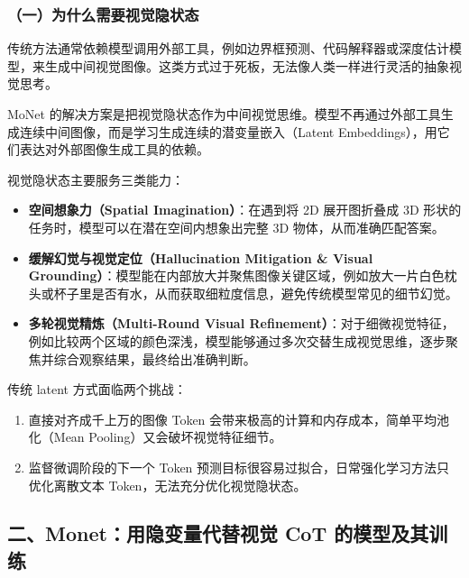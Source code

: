 \hypertarget{ux4e00ux4e3aux4ec0ux4e48ux9700ux8981ux89c6ux89c9ux9690ux72b6ux6001}{%
\subsubsection{（一）为什么需要视觉隐状态}\label{ux4e00ux4e3aux4ec0ux4e48ux9700ux8981ux89c6ux89c9ux9690ux72b6ux6001}}

传统方法通常依赖模型调用外部工具，例如边界框预测、代码解释器或深度估计模型，来生成中间视觉图像。这类方式过于死板，无法像人类一样进行灵活的抽象视觉思考。

MoNet 的解决方案是把视觉隐状态作为中间视觉思维。模型不再通过外部工具生成连续中间图像，而是学习生成连续的潜变量嵌入（Latent Embeddings），用它们表达对外部图像生成工具的依赖。

视觉隐状态主要服务三类能力：

\begin{itemize}
\tightlist
\item
  \textbf{空间想象力（Spatial Imagination）}：在遇到将 2D 展开图折叠成 3D 形状的任务时，模型可以在潜在空间内想象出完整 3D 物体，从而准确匹配答案。
\item
  \textbf{缓解幻觉与视觉定位（Hallucination Mitigation \& Visual Grounding）}：模型能在内部放大并聚焦图像关键区域，例如放大一片白色枕头或杯子里是否有水，从而获取细粒度信息，避免传统模型常见的细节幻觉。
\item
  \textbf{多轮视觉精炼（Multi-Round Visual Refinement）}：对于细微视觉特征，例如比较两个区域的颜色深浅，模型能够通过多次交替生成视觉思维，逐步聚焦并综合观察结果，最终给出准确判断。
\end{itemize}

传统 latent 方式面临两个挑战：

\begin{enumerate}
\def\labelenumi{\arabic{enumi}.}
\tightlist
\item
  直接对齐成千上万的图像 Token 会带来极高的计算和内存成本，简单平均池化（Mean Pooling）又会破坏视觉特征细节。
\item
  监督微调阶段的下一个 Token 预测目标很容易过拟合，日常强化学习方法只优化离散文本 Token，无法充分优化视觉隐状态。
\end{enumerate}

\hypertarget{ux4e8cmonetux7528ux9690ux53d8ux91cfux4ee3ux66ffux89c6ux89c9-cot-ux7684ux6a21ux578bux53caux5176ux8badux7ec3}{%
\subsection{二、Monet：用隐变量代替视觉 CoT 的模型及其训练}\label{ux4e8cmonetux7528ux9690ux53d8ux91cfux4ee3ux66ffux89c6ux89c9-cot-ux7684ux6a21ux578bux53caux5176ux8badux7ec3}}

